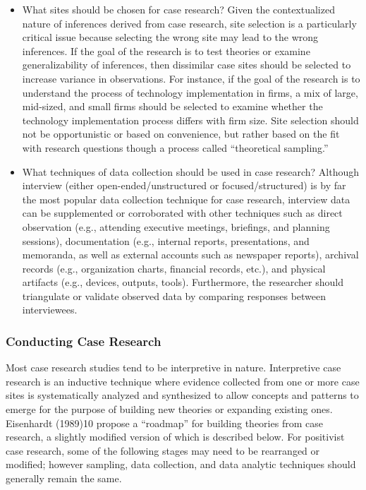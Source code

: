 \begin{itemize}
	\item What sites should be chosen for case research? Given the contextualized nature of inferences derived from case research, site selection is a particularly critical issue because selecting the wrong site may lead to the wrong inferences. If the goal of the research is to test theories or examine generalizability of inferences, then dissimilar case sites should be selected to increase variance in observations. For instance, if the goal of the research is to understand the process of technology implementation in firms, a mix of large, mid-sized, and small firms should be selected to examine whether the technology implementation process differs with firm size. Site selection should not be opportunistic or based on convenience, but rather based on the fit with research questions though a process called ``theoretical sampling.''

	\item What techniques of data collection should be used in case research? Although interview (either open-ended/unstructured or focused/structured) is by far the most popular data collection technique for case research, interview data can be supplemented or corroborated with other techniques such as direct observation (e.g., attending executive meetings, briefings, and planning sessions), documentation (e.g., internal reports, presentations, and memoranda, as well as external accounts such as newspaper reports), archival records (e.g., organization charts, financial records, etc.), and physical artifacts (e.g., devices, outputs, tools). Furthermore, the researcher should triangulate or validate observed data by comparing responses between interviewees.
\end{itemize}

\subsubsection{Conducting Case Research}

Most case research studies tend to be interpretive in nature. Interpretive case research is an inductive technique where evidence collected from one or more case sites is systematically analyzed and synthesized to allow concepts and patterns to emerge for the purpose of building new theories or expanding existing ones. Eisenhardt (1989)10 propose a ``roadmap'' for building theories from case research, a slightly modified version of which is described below. For positivist case research, some of the following stages may need to be rearranged or modified; however sampling, data collection, and data analytic techniques should generally remain the same.


